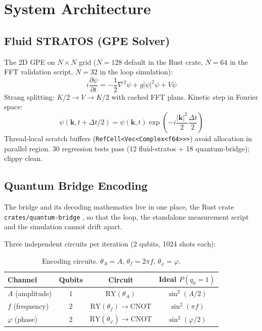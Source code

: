\documentclass[sigconf,anonymous=false]{acmart}
\begin{document}
\section{System Architecture}

\subsection{Fluid STRATOS (GPE Solver)}

The 2D GPE on $N\times N$ grid ($N=128$ default in the Rust crate, $N=64$ in the FFT validation script, $N=32$ in the loop simulation):
\begin{equation}
i\frac{\partial\psi}{\partial t} = -\frac{1}{2}\nabla^2\psi + g|\psi|^2\psi + V\psi
\end{equation}
Strang splitting: $K/2 \to V \to K/2$ with cached FFT plans. Kinetic step in Fourier space:
\begin{equation}
\psi(\mathbf{k}, t+\Delta t/2) = \psi(\mathbf{k}, t) \exp\left(-i \frac{|\mathbf{k}|^2}{2} \frac{\Delta t}{2}\right)
\end{equation}
Thread-local scratch buffers (\texttt{RefCell<Vec<Complex<f64>>>}) avoid allocation in parallel region. 30 regression tests pass (12 fluid-stratos + 18 quantum-bridge); clippy clean.

\subsection{Quantum Bridge Encoding}

The bridge and its decoding mathematics live in one place, the Rust crate
\texttt{crates/quantum-bridge} \cite{QOI-bridge}, so that the loop, the standalone
measurement script and the simulation cannot drift apart.

Three independent circuits per iteration (2 qubits, 1024 shots each):

\begin{table}[h]
\centering
\caption{Encoding circuits. $\theta_A = A$, $\theta_f = 2\pi f$, $\theta_\varphi = \varphi$.}
\label{tab:encoding}
\begin{tabular}{lccc}
\toprule
Channel & Qubits & Circuit & Ideal $P(q_0=1)$ \\
\midrule
$A$ (amplitude) & 1 & $\text{RY}(\theta_A)$ & $\sin^2(A/2)$ \\
$f$ (frequency) & 2 & $\text{RY}(\theta_f) \to \text{CNOT}$ & $\sin^2(\pi f)$ \\
$\varphi$ (phase) & 2 & $\text{RY}(\theta_\varphi) \to \text{CNOT}$ & $\sin^2(\varphi/2)$ \\
\bottomrule
\end{tabular}
\end{table}
\end{document}
